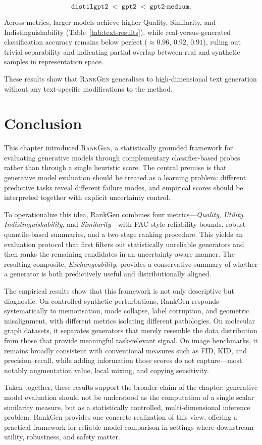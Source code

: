 \[
\texttt{distilgpt2} \;<\; \texttt{gpt2} \;<\; \texttt{gpt2-medium}.
\]

Across metrics, larger models achieve higher Quality, Similarity, and Indistinguishability (Table~\ref{tab:text-results}), while real-versus-generated classification accuracy remains below perfect ($\approx 0.96$, $0.92$, $0.91$), ruling out trivial separability and indicating partial overlap between real and synthetic samples in representation space.

These results show that \textsc{RankGen} generalises to high-dimensional text generation without any text-specific modifications to the method.
\section{Conclusion}
\label{sec:conclusion-rankgen}
This chapter introduced \textsc{RankGen}, a statistically grounded framework for
evaluating generative models through complementary classifier-based probes rather
than through a single heuristic score. The central premise is that generative
model evaluation should be treated as a learning problem: different predictive
tasks reveal different failure modes, and empirical scores should be interpreted
together with explicit uncertainty control.

To operationalize this idea, RankGen combines four metrics---\emph{Quality},
\emph{Utility}, \emph{Indistinguishability}, and \emph{Similarity}---with
PAC-style reliability bounds, robust quantile-based summaries, and a two-stage
ranking procedure. This yields an evaluation protocol that first filters out
statistically unreliable generators and then ranks the remaining candidates in
an uncertainty-aware manner. The resulting composite,
\emph{Exchangeability}, provides a conservative summary of whether a generator is
both predictively useful and distributionally aligned.

The empirical results show that this framework is not only descriptive but
diagnostic. On controlled synthetic perturbations, RankGen responds
systematically to memorisation, mode collapse, label corruption, and geometric
misalignment, with different metrics isolating different pathologies. On
molecular graph datasets, it separates generators that merely resemble the data
distribution from those that provide meaningful task-relevant signal. On image
benchmarks, it remains broadly consistent with conventional measures such as
FID, KID, and precision--recall, while adding information those scores do not
capture---most notably augmentation value, local mixing, and copying
sensitivity.

Taken together, these results support the broader claim of the chapter:
generative model evaluation should not be understood as the computation of a
single scalar similarity measure, but as a statistically controlled,
multi-dimensional inference problem. RankGen provides one concrete realization
of this view, offering a practical framework for reliable model comparison in
settings where downstream utility, robustness, and safety matter.
